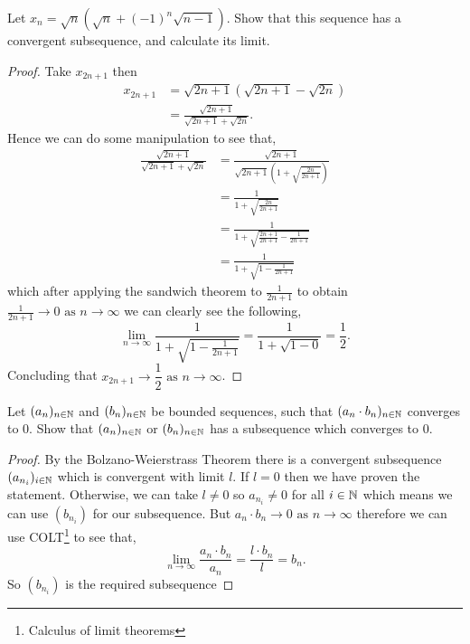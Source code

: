 \documentclass[10pt, a4paper]{article}
\newcommand{\limas}[3][n]{#2 \rightarrow #3 \text{ as } #1 \rightarrow \infty}
\begin{document}
\begin{example}
    Let $x_n = \sqrt{n}(\sqrt{n}+(-1)^n\sqrt{n - 1})$. Show that this sequence has a convergent subsequence, and calculate its limit.
    \begin{proof}
        Take $x_{2n + 1}$ then
        \begin{align*}
        x_{2n + 1} &= \sqrt{2n + 1}(\sqrt{2n + 1} - \sqrt{2n}) \\
        &= \frac{\sqrt{2n + 1}}{\sqrt{2n + 1} + \sqrt{2n}}.
        \end{align*}
        Hence we can do some manipulation to see that,
        \begin{align*}
        \frac{\sqrt{2n + 1}}{\sqrt{2n + 1} + \sqrt{2n}} &= \frac{\sqrt{2n + 1}}{\sqrt{2n + 1}\left(1 + \sqrt{\frac{2n}{2n + 1}}\right)} \\
        &= \frac{1}{1 + \sqrt{\frac{2n}{2n + 1}}} \\
        &= \frac{1}{1 + \sqrt{\frac{2n + 1}{2n + 1} - \frac{1}{2n + 1}}} \\
        &= \frac{1}{1 + \sqrt{1 - \frac{1}{2n + 1}}}
        \end{align*}
        which after applying the sandwich theorem to $\frac{1}{2n + 1}$ to obtain $\limas{\frac{1}{2n + 1}}{0}$ we can clearly see the following,
        \[
        \lim_{n \rightarrow \infty}\frac{1}{1 + \sqrt{1 - \frac{1}{2n + 1}}} = \frac{1}{1 + \sqrt{1 - 0}} = \frac{1}{2}.
        \]
        Concluding that $\limas{x_{2n + 1}}{\dfrac{1}{2}}$.
    \end{proof}
\end{example}

\begin{example}
    Let $(a_n)_{n \in \mathbb{N}}$ and $(b_n)_{n \in \mathbb{N}}$ be bounded sequences, such that $(a_n \cdot b_n)_{n \in \mathbb{N}}$ converges to 0. Show that $(a_n)_{n \in \mathbb{N}}$ or $(b_n)_{n \in \mathbb{N}}$ has a subsequence which converges to $0$.
    \begin{proof}
        By the Bolzano-Weierstrass Theorem there is a convergent subsequence $(a_{n_i})_{i \in \mathbb{N}}$ which is convergent with limit $l$. If $l = 0$ then we have proven the statement. Otherwise, we can take $l \neq 0$ so $a_{n_i} \neq 0$ for all $i \in \mathbb{N}$ which means we can use $(b_{n_i})$ for our subsequence. But $\limas{a_n \cdot b_n}{0}$ therefore we can use COLT\footnote{Calculus of limit theorems} to see that,
        \[
        \lim_{n \rightarrow \infty}\frac{a_n \cdot b_n}{a_n} = \frac{l \cdot b_n}{l} = b_n.
        \]
        So $(b_{n_i})$ is the required subsequence
    \end{proof}
\end{example}
\end{document}
